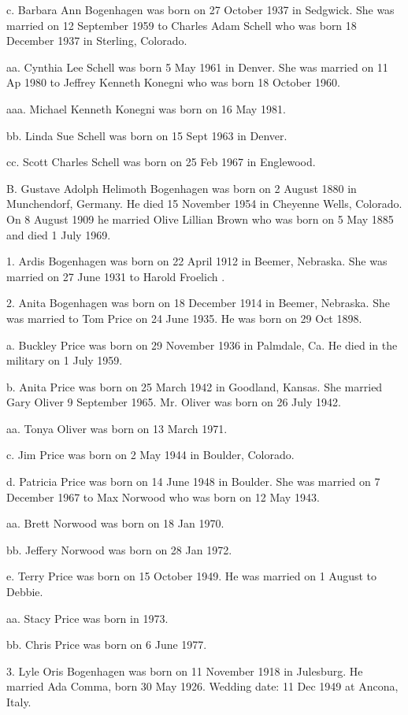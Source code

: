 \documentclass[a4paper]{article}
\begin{document}
c. Barbara Ann Bogenhagen was born on 27 October 1937 in Sedgwick. She was married on 12 September 1959 to Charles Adam Schell who was born 18 December 1937 in Sterling, Colorado.

aa. Cynthia Lee Schell was born 5 May 1961 in Denver.  She was married on 11 Ap 1980 to Jeffrey Kenneth Konegni who was born 18 October 1960.

aaa. Michael Kenneth Konegni was born on 16 May 1981.

bb. Linda Sue Schell was born on 15 Sept 1963 in Denver.

cc. Scott Charles Schell was born on 25 Feb 1967 in Englewood.

B. Gustave Adolph Helimoth Bogenhagen was born on 2 August 1880 in Munchendorf, Germany.  He died 15 November 1954 in Cheyenne Wells, Colorado.  On 8 August 1909 he married Olive Lillian Brown who was born on 5 May 1885 and died 1 July 1969.

1. Ardis Bogenhagen was born on 22 April 1912 in Beemer, Nebraska.  She was married on 27 June 1931 to Harold Froelich .

2. Anita Bogenhagen was born on 18 December 1914 in Beemer, Nebraska.  She was married to Tom Price on 24 June 1935.  He was born on 29 Oct 1898.

a. Buckley Price was born on 29 November 1936 in Palmdale, Ca.  He died in the military on 1 July 1959.

b. Anita Price was born on 25 March 1942 in Goodland, Kansas.  She married Gary Oliver 9 September 1965.  Mr. Oliver was born on 26 July 1942.

aa. Tonya Oliver was born on 13 March 1971.

c. Jim Price was born on 2 May 1944 in Boulder, Colorado.

d. Patricia Price was born on 14 June 1948 in Boulder. She was married on 7 December 1967 to Max Norwood who was born on 12 May 1943.

aa. Brett Norwood was born on 18 Jan 1970.

bb. Jeffery Norwood was born on 28 Jan 1972.

e. Terry Price was born on 15 October 1949.  He was married on 1 August to Debbie.

aa. Stacy Price was born in 1973.

bb. Chris Price was born on 6 June 1977.

3. Lyle Oris Bogenhagen was born on 11 November 1918 in Julesburg.  He married Ada Comma, born 30 May 1926.  Wedding date: 11 Dec 1949 at Ancona, Italy.
\end{document}
